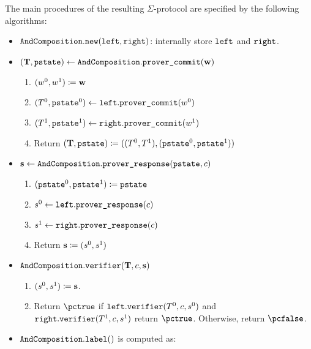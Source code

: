 \documentclass[11pt]{article}
\begin{document}
The main procedures of the resulting $\Sigma$-protocol are specified by the following algorithms:
\begin{itemize}
  \item
  $\texttt{AndComposition}.\texttt{new}(\texttt{left}, \texttt{right})$: internally store $\texttt{left}$ and $\texttt{right}$.
  \item
  $(\mathbf {T}, \texttt{pstate})\gets \texttt{AndComposition}.\texttt{prover\_commit}(\mathbf {w})$
    \begin{enumerate}
      \item
        $(w^0,w^1)\coloneqq \mathbf {w}$
      \item
        $(T^0,\texttt{pstate}^0)\gets\texttt{left}.\texttt{prover\_commit}(w^0)$
      \item $(T^1,\texttt{pstate}^1)\gets\texttt{right}.\texttt{prover\_commit}(w^1)$
      \item
	Return $(\mathbf {T},\texttt{pstate}) \coloneqq ((T^0,  T^1),(\texttt{pstate}^0,\texttt{pstate}^1))$
    \end{enumerate}
  \item
  $\mathbf {s} \gets \texttt{AndComposition}.\texttt{prover\_response}(\texttt{pstate}, c)$
  \begin{enumerate}
      \item
	    $(\texttt{pstate}^0,\texttt{pstate}^1)\coloneqq \texttt{pstate}$
      \item
      $s^0\gets\texttt{left}.\texttt{prover\_response}(c)$
      \item
      $s^1\gets\texttt{right}.\texttt{prover\_response}(c)$
      \item
      Return $\mathbf {s}\coloneqq(s^0,s^1)$
    \end{enumerate}
  \item
  $\texttt{AndComposition}.\texttt{verifier}(\mathbf {T}, c, \mathbf {s})$
  \begin{enumerate}
      \item
        $(s^0,s^1)\coloneqq \mathbf {s}$.
      \item
	Return $\accept$ if $\texttt{left}.\texttt{verifier}(T^0,c, s^0)$ and $\texttt{right}.\texttt{verifier}(T^1,c, s^1)$ return $\accept$. Otherwise, return $\reject$.
    \end{enumerate}
  \item  $\texttt{AndComposition}.\texttt{label}()$ is computed as:

\end{itemize}
\end{document}
